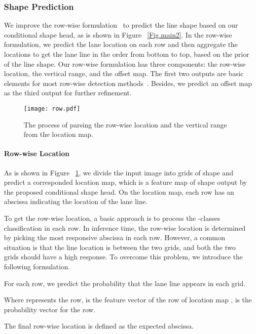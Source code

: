 \documentclass[10pt,twocolumn,letterpaper]{article}
\begin{document}
\subsubsection{Shape Prediction}
We improve the row-wise formulation~\cite{qin2020ultra} to predict the line shape based on our conditional shape head, as is shown in Figure ~\ref{Fig.main2}. In the row-wise formulation, we predict the lane location on each row and then 
aggregate the locations to get the lane line in the order from bottom to top, based on the prior of the line shape. Our row-wise formulation has three components: the row-wise location, the vertical range, and the offset map. The first two outputs are basic elements for most row-wise detection methods~\cite{qin2020ultra, yoo2020end}. Besides, we predict an offset map as the third output for further refinement.

\begin{figure}[ht]
\centering
\texttt{[image: row.pdf]}
\caption{The process of parsing the row-wise location and the vertical range from the location map.} \label{Fig.row} \end{figure}

\paragraph{Row-wise Location}
As is shown in Figure ~\ref{Fig.row}, we divide the input image into grids of shape  and predict a corresponded location map, which is a feature map of shape  output by the proposed conditional shape head. On the location map, each row has an abscissa indicating the location of the lane line.

To get the row-wise location, a basic approach is to process the -classes classification in each row. In inference time, the row-wise location is determined by picking the most responsive abscissa in each row. However, a common situation is that the line location is between the two grids, and both the two grids should have a high response. To overcome this problem, we introduce the following formulation.

For each row, we predict the probability that the lane line appears in each grid.

Where  represents the  row,  is the feature vector of the  row of location map ,  is the probability vector for the  row.

The final row-wise location is defined as the expected abscissa.
\end{document}
